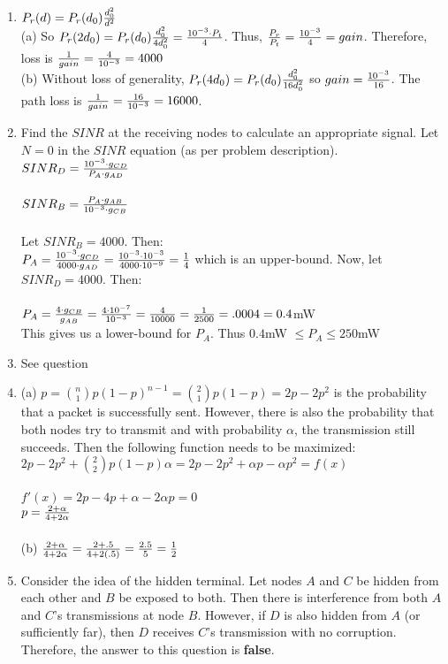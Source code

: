 \documentclass[letterpaper, 12pt]{article}
\begin{document}
\begin{enumerate}
\item $P_r(d) = P_r(d_0){d_0^2 \over d^2}$ \\
(a) So $P_r(2d_0) = P_r(d_0){d_0^2 \over {4d_0^2}} = {{10^{-3} \cdot P_t} \over 4}$. Thus, ${P_r \over P_t} = {10^{-3} \over 4} = gain$. Therefore, loss is ${1 \over gain} = {4 \over 10^{-3}} = 4000$ \\
(b) Without loss of generality, $P_r(4d_0) = P_r(d_0){d_0^2 \over {16d_0^2}}$ so $gain = {{10^{-3} \over 16}}$. The path loss is ${1 \over gain} = {16 \over 10^{-3}} = 16000$.

\item Find the $SINR$ at the receiving nodes to calculate an appropriate signal. Let $N = 0$ in the $SINR$ equation (as per problem description). \\
$SINR_D = {{10^{-3}} \cdot g_{CD} \over {P_A \cdot g_{AD}}}$ \\\\
$SINR_B = {P_A \cdot {g_{AB}} \over {{10^{-3}} \cdot g_{CB}}}$ \\\\
Let $SINR_B = 4000$. Then: \\
$P_A = {{10^{-3} \cdot g_{CD}} \over {4000 \cdot g_{AD}}} = {{10^{-3} \cdot {10^{-3}}} \over {4000 \cdot {10^{-9}}}} = {1 \over 4}$ which is an upper-bound. Now, let $SINR_D = 4000$. Then: \\\\
$P_A = {{4 \cdot g_{CB}} \over {g_{AB}}} = {{4 \cdot {10^{-7}} \over {10^{-3}}}} = {4 \over 10000} = {1 \over 2500} = .0004 = 0.4$mW \\
This gives us a lower-bound for $P_A$. Thus $0.4$mW $\le P_A \le 250$mW
\item See question
\item (a) $p = {n \choose 1}p(1-p)^{n-1} = {2 \choose 1}p(1-p) = 2p - 2p^2$ is the probability that a packet is successfully sent. However, there is also the probability that both nodes try to transmit and with probability $\alpha$, the transmission still succeeds. Then the following function needs to be maximized: \\
$2p - 2p^2 + {2 \choose 2}p(1-p)\alpha = 2p - 2p^2 + \alpha p - \alpha p^2 = f(x)$ \\\\
$f'(x) = 2p - 4p + \alpha - 2\alpha p = 0$ \\
$p = {{2 + \alpha} \over {4 + 2\alpha}}$ \\\\
(b) ${{2 + \alpha} \over {4 + 2\alpha}} =  {{2 + .5} \over {4 + 2(.5)}} = {2.5 \over 5} = {1 \over 2}$

\item Consider the idea of the hidden terminal. Let nodes $A$ and $C$ be hidden from each other and $B$ be exposed to both. Then there is interference from both $A$ and $C$'s transmissions at node $B$. However, if $D$ is also hidden from $A$ (or sufficiently far), then $D$ receives $C$'s transmission with no corruption. Therefore, the answer to this question is \textbf{false}.
\end{enumerate}
\end{document}
